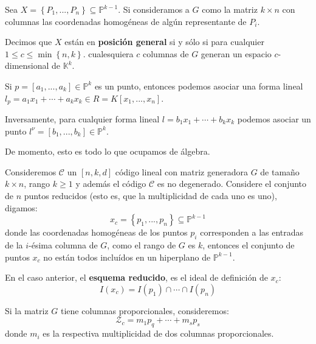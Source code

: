 \documentclass[12pt]{report}
\theoremstyle{largebreak}
\begin{document}
    \begin{mydef}
        Sea $X=\left\{P_1,...,P_n \right\}\subseteq\mathbb{P}^{ k-1}$. Si consideramos a $G$ como la matriz $k\times n$ con columnas las coordenadas homogéneas de algún representante de $P_i$.

        Decimos que $X$ están en \textbf{posición general} si y sólo si para cualquier $1\leq c\leq \min\left\{n,k \right\}$. cualesquiera $c$ columnas de $G$ generan un espacio $c$-dimensional de $\mathbb{K}^k$.
    \end{mydef}

    \begin{mydef}
        Si $p=[a_1,...,a_k]\in\mathbb{P}^k$ es un punto, entonces podemos asociar una forma lineal $l_p=a_1x_1+\cdots+a_kx_k\in R=K[x_1,...,x_n]$.
        
        Inversamente, para cualquier forma lineal $l=b_1x_1+\cdots+b_kx_k$ podemos asociar un punto $l^\nu=[b_1,...,b_k]\in\mathbb{P}^k$. 
    \end{mydef}

    De momento, esto es todo lo que ocupamos de álgebra.

    Consideremos $\mathcal{C}$ un $[n,k,d]$ código lineal con matriz generadora $G$ de tamaño $k\times n$, rango $k\geq 1$ y además el código $\mathcal{C}$ es no degenerado. Considere el conjunto de $n$ puntos reducidos (esto es, que la multiplicidad de cada uno es uno), digamos:
    \begin{equation*}
        x_c=\left\{p_1,...,p_n \right\}\subseteq\mathbb{P}^{ k-1}
    \end{equation*}
    donde las coordenadas homogéneas de los puntos $p_i$ corresponden a las entradas de la $i$-ésima columna de $G$, como el rango de $G$ es $k$, entonces el conjunto de puntos $x_c$ no están todos incluídos en un hiperplano de $\mathbb{P}^{ k-1}$.

    \begin{mydef}
        En el caso anterior, el \textbf{esquema reducido}, es el ideal de definición de $x_c$:
        \begin{equation*}
            I(x_c)=I(p_1)\cap\cdots\cap I(p_n)
        \end{equation*}
    \end{mydef}

    Si la matriz $G$ tiene columnas proporcionales, consideremos:
    \begin{equation*}
        \mathcal{Z}_c=m_1p_q+\cdots+m_sp_s
    \end{equation*}
    donde $m_i$ es la respectiva multiplicidad de dos columnas proporcionales.
\end{document}
